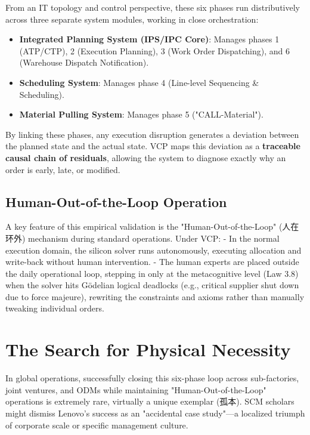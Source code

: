 \documentclass[11pt,a4paper]{article}
\begin{document}
From an IT topology and control perspective, these six phases run distributively across three separate system modules, working in close orchestration:
\begin{itemize}
    \item \textbf{Integrated Planning System (IPS/IPC Core)}: Manages phases 1 (ATP/CTP), 2 (Execution Planning), 3 (Work Order Dispatching), and 6 (Warehouse Dispatch Notification).
    \item \textbf{Scheduling System}: Manages phase 4 (Line-level Sequencing \& Scheduling).
    \item \textbf{Material Pulling System}: Manages phase 5 ("CALL-Material").
\end{itemize}

By linking these phases, any execution disruption generates a deviation between the planned state and the actual state. VCP maps this deviation as a \textbf{traceable causal chain of residuals}, allowing the system to diagnose exactly why an order is early, late, or modified.

\subsection{Human-Out-of-the-Loop Operation}
A key feature of this empirical validation is the "Human-Out-of-the-Loop" (人在环外) mechanism during standard operations. Under VCP:
- In the normal execution domain, the silicon solver runs autonomously, executing allocation and write-back without human intervention.
- The human experts are placed outside the daily operational loop, stepping in only at the metacognitive level (Law 3.8) when the solver hits G\"odelian logical deadlocks (e.g., critical supplier shut down due to force majeure), rewriting the constraints and axioms rather than manually tweaking individual orders.

\section{The Search for Physical Necessity}
In global operations, successfully closing this six-phase loop across sub-factories, joint ventures, and ODMs while maintaining "Human-Out-of-the-Loop" operations is extremely rare, virtually a unique exemplar (孤本). SCM scholars might dismiss Lenovo's success as an "accidental case study"—a localized triumph of corporate scale or specific management culture.
\end{document}
